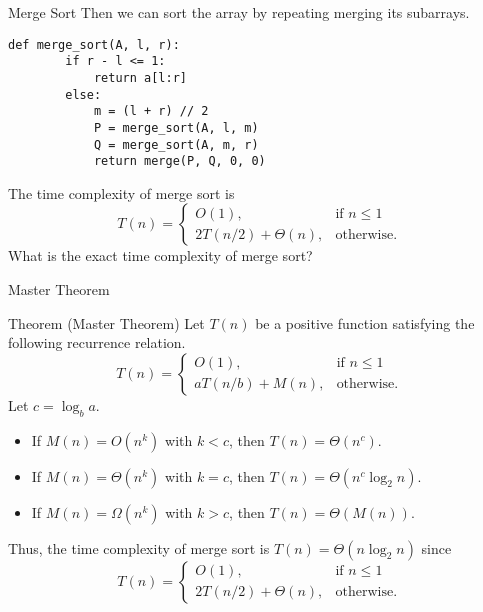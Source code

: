 \documentclass{beamer}
\begin{document}
\begin{frame}[fragile]{Merge Sort}
  Then we can sort the array by repeating merging its subarrays.
  \begin{block}{}
    \scriptsize
    \begin{lstlisting}[gobble=4]
    def merge_sort(A, l, r):
        if r - l <= 1:
            return a[l:r]
        else:
            m = (l + r) // 2
            P = merge_sort(A, l, m)
            Q = merge_sort(A, m, r)
            return merge(P, Q, 0, 0)
    \end{lstlisting}
    \pause
  \end{block}
  The time complexity of merge sort is
  \begin{equation*}
    T(n) =
    \begin{cases}
      O(1), & \text{if $n \leq 1$} \\
      2T(n / 2) + \Theta(n), & \text{otherwise}.
    \end{cases}
  \end{equation*}
  \pause
  What is the exact time complexity of merge sort?
\end{frame}

\begin{frame}{Master Theorem}
  \begin{block}{Theorem (Master Theorem)}
    \pause
    \small
    Let $T(n)$ be a positive function satisfying the following recurrence
    relation.
    \begin{equation*}
      T(n) =
      \begin{cases}
        O(1), & \text{if $n \leq 1$} \\
        aT(n / b) + M(n), & \text{otherwise}.
      \end{cases}
    \end{equation*}
    Let $c = \log_b a$.
    \begin{itemize}
      \item If $M(n) = O(n^k)$ with $k < c$, then $T(n) = \Theta(n^c)$. \pause
      \item If $M(n) = \Theta(n^k)$ with $k = c$,
      then $T(n) = \Theta(n^c \log_2 n)$. \pause
      \item If $M(n) = \Omega(n^k)$ with $k > c$, then $T(n) = \Theta(M(n))$.
      \pause
    \end{itemize}
  \end{block}
  Thus, the time complexity of merge sort is $T(n) = \Theta(n \log_2 n)$ since
  \begin{equation*}
    T(n) =
    \begin{cases}
      O(1), & \text{if $n \leq 1$} \\
      2T(n / 2) + \Theta(n), & \text{otherwise}.
    \end{cases}
  \end{equation*}
\end{frame}
\end{document}
